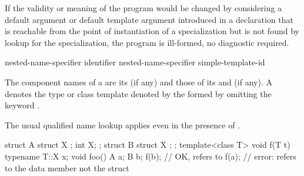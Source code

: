 \pnum
If the validity or meaning of the program would be changed by
considering a default argument or default template argument
introduced in a declaration that is reachable from
the point of instantiation of a specialization
but is not found by lookup for the specialization,
the program is ill-formed, no diagnostic required.

\begin{bnf}
\br
   nested-name-specifier identifier\br
   nested-name-specifier  simple-template-id
\end{bnf}

\pnum
{}%
The component names of a  are
its  (if any) and
those of its  and
 (if any).
A 
denotes the type or class template
denoted by the 
formed by omitting the keyword .
\begin{note}
The usual qualified name lookup applies
even in the presence of .
\end{note}
\begin{example}
\begin{codeblock}
struct A {
  struct X { };
  int X;
};
struct B {
  struct X { };
};
template<class T> void f(T t) {
  typename T::X x;
}
void foo() {
  A a;
  B b;
  f(b);             // OK,  refers to 
  f(a);             // error:  refers to the data member  not the struct 
}
\end{codeblock}
\end{example}

